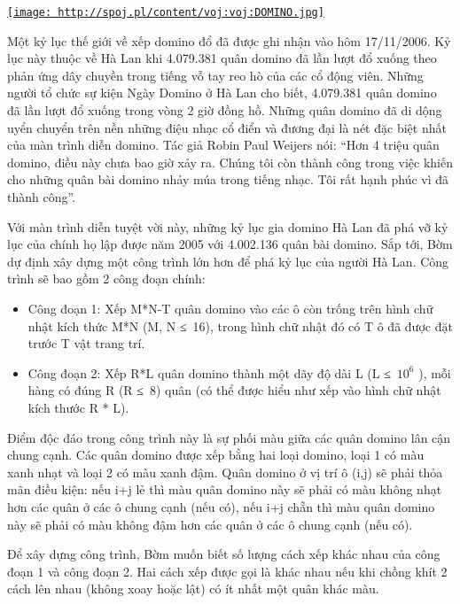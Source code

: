 \href{../../../../embed/voj:voj:DOMINO.jpg}{
\texttt{[image: http://spoj.pl/content/voj:voj:DOMINO.jpg]}}

   Một kỷ lục thế giới về xếp domino đổ đã được ghi nhận vào hôm 17/11/2006. Kỷ lục này thuộc về Hà Lan khi 4.079.381 quân domino đã lần lượt đổ xuống theo phản ứng dây chuyền trong tiếng vỗ tay reo hò của các cổ động viên. Những người tổ chức sự kiện Ngày Domino ở Hà Lan cho biết, 4.079.381 quân domino đã lần lượt đổ xuống trong vòng 2 giờ đồng hồ. Những quân domino đã di dộng uyển chuyển trên nền những điệu nhạc cổ điển và đương đại là nét đặc biệt nhất của màn trình diễn domino. Tác giả Robin Paul Weijers nói: “Hơn 4 triệu quân domino, điều này chưa bao giờ xảy ra. Chúng tôi còn thành công trong việc khiến cho những quân bài domino nhảy múa trong tiếng nhạc. Tôi rất hạnh phúc vì đã thành công”.  

   Với màn trình diễn tuyệt vời này, những kỷ lục gia domino Hà Lan đã phá vỡ kỷ lục của chính họ lập được năm 2005 với 4.002.136 quân bài domino. Sắp tới, Bờm dự định xây dựng một công trình lớn hơn để phá kỷ lục của người Hà Lan. Công trình sẽ bao gồm 2 công đoạn chính:  
\begin{itemize}
	\item     Công đoạn 1: Xếp M*N-T quân domino vào các ô còn trống trên hình chữ nhật kích thức M*N (M, N ≤ 16), trong hình chữ nhật đó có T ô đã được đặt trước T vật trang trí.   
	\item     Công đoạn 2: Xếp R*L quân domino thành một dãy độ dài L (L ≤ $10^{6}$    ), mỗi hàng có đúng R (R ≤ 8) quân (có thể được hiểu như xếp vào hình chữ nhật kích thước R * L).   
\end{itemize}

   Điểm độc đáo trong công trình này là sự phối màu giữa các quân domino lân cận chung cạnh. Các quân domino được xếp bằng hai loại domino, loại 1 có màu xanh nhạt và loại 2 có màu xanh đậm. Quân domino ở vị trí ô (i,j) sẽ phải thỏa mãn điều kiện: nếu i+j lẻ thì màu quân domino này sẽ phải có màu không nhạt hơn các quân ở các ô chung cạnh (nếu có), nếu i+j chẵn thì màu quân domino này sẽ phải có màu không đậm hơn các quân ở các ô chung cạnh (nếu có).  

   Để xây dựng công trình, Bờm muốn biết số lượng cách xếp khác nhau của công đoạn 1 và công đoạn 2. Hai cách xếp được gọi là khác nhau nếu khi chồng khít 2 cách lên nhau (không xoay hoặc lật) có ít nhất một quân khác màu.